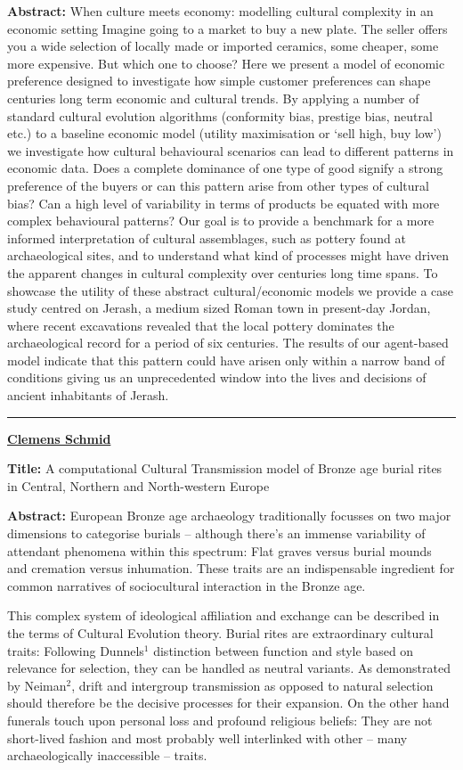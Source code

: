 \documentclass[]{article}
\begin{document}
\textbf{Abstract:} When culture meets economy: modelling cultural
complexity in an economic setting Imagine going to a market to buy a new
plate. The seller offers you a wide selection of locally made or
imported ceramics, some cheaper, some more expensive. But which one to
choose? Here we present a model of economic preference designed to
investigate how simple customer preferences can shape centuries long
term economic and cultural trends. By applying a number of standard
cultural evolution algorithms (conformity bias, prestige bias, neutral
etc.) to a baseline economic model (utility maximisation or `sell high,
buy low') we investigate how cultural behavioural scenarios can lead to
different patterns in economic data. Does a complete dominance of one
type of good signify a strong preference of the buyers or can this
pattern arise from other types of cultural bias? Can a high level of
variability in terms of products be equated with more complex
behavioural patterns? Our goal is to provide a benchmark for a more
informed interpretation of cultural assemblages, such as pottery found
at archaeological sites, and to understand what kind of processes might
have driven the apparent changes in cultural complexity over centuries
long time spans. To showcase the utility of these abstract
cultural/economic models we provide a case study centred on Jerash, a
medium sized Roman town in present-day Jordan, where recent excavations
revealed that the local pottery dominates the archaeological record for
a period of six centuries. The results of our agent-based model indicate
that this pattern could have arisen only within a narrow band of
conditions giving us an unprecedented window into the lives and
decisions of ancient inhabitants of Jerash.

\rule{4cm}{.4pt}

{\bf \href{https://hcommons.org/members/nevrome/}{Clemens Schmid}}

\textbf{Title:} A computational Cultural Transmission model of Bronze
age burial rites in Central, Northern and North-western Europe

\textbf{Abstract:} European Bronze age archaeology traditionally
focusses on two major dimensions to categorise burials -- although
there's an immense variability of attendant phenomena within this
spectrum: Flat graves versus burial mounds and cremation versus
inhumation. These traits are an indispensable ingredient for common
narratives of sociocultural interaction in the Bronze
age.

This complex system of ideological affiliation and
exchange can be described in the terms of Cultural Evolution theory.
Burial rites are extraordinary cultural traits: Following Dunnels$^1$
distinction between function and style based on relevance for selection,
they can be handled as neutral variants. As demonstrated by Neiman$^2$,
drift and intergroup transmission as opposed to natural selection should
therefore be the decisive processes for their expansion. On the other
hand funerals touch upon personal loss and profound religious beliefs:
They are not short-lived fashion and most probably well interlinked with
other -- many archaeologically inaccessible --
traits.
\end{document}
